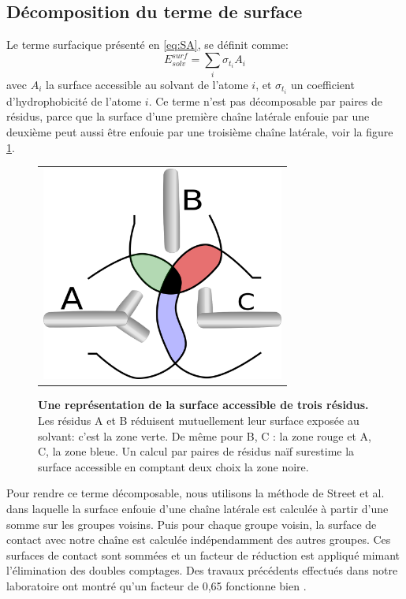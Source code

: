 \subsection{Décomposition du terme de surface}
\label{sub:surpairwise}

Le terme surfacique présenté en \vref{eq:SA}, se définit comme:
\begin{equation}
E_{solv}^{surf} = \sum_i \sigma_{t_i} A_i 
\end{equation}
avec $A_i$ la surface accessible au solvant de l'atome $i$, et $\sigma_{t_i}$ un coefficient d'hydrophobicité de l'atome $i$.
Ce terme n'est pas décomposable par paires de résidus, parce que la surface d'une première chaîne latérale enfouie par une deuxième peut aussi être enfouie par une troisième chaîne latérale, voir la figure \ref{fig:intersurf}.

   \begin{figure}[!htbp]
     \centering
     \begin{tabular}{c}
       \includegraphics[width=8cm]{figure/intersurface.png} 
     \end{tabular}
     
     \caption{\textbf{Une représentation de la surface accessible de trois résidus.} Les résidus A et B réduisent mutuellement leur surface exposée au solvant: c'est la zone verte. De même pour B, C : la zone rouge et  A, C, la zone bleue. Un calcul par paires de résidus naïf surestime la surface accessible en comptant deux choix la zone noire. }
\label{fig:intersurf}
   \end{figure}


Pour rendre ce terme décomposable, nous utilisons la méthode de Street et al. \cite{Street98} dans laquelle la surface enfouie d'une chaîne latérale est calculée à partir d'une somme sur les groupes voisins. Puis pour chaque groupe voisin, la surface de contact avec notre chaîne est calculée indépendamment des autres groupes. Ces surfaces de contact sont sommées et un facteur de réduction est appliqué mimant l'élimination des doubles comptages. Des travaux précédents effectués dans notre laboratoire ont montré qu'un facteur de 0,65 fonctionne bien \cite{Lopes07,Gaillard14}.   


